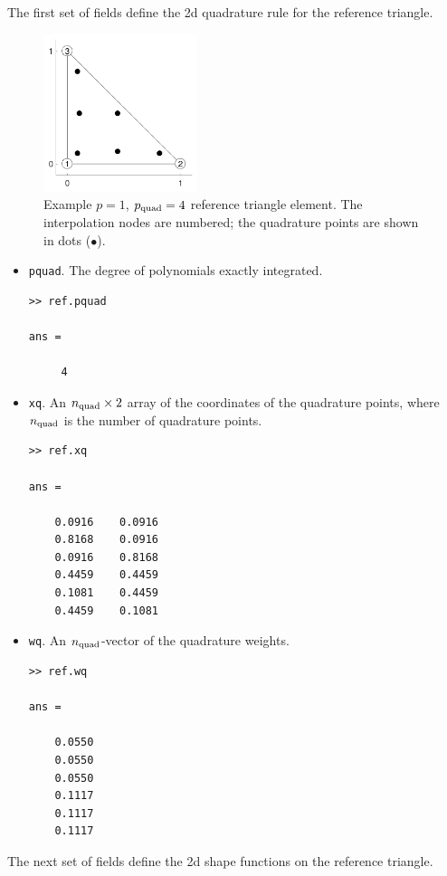 \documentclass[openany,preprint,11pt]{article}
\begin{document}
The first set of fields define the 2d quadrature rule for the reference triangle.
\begin{figure}[!h]
  \centering
  \includegraphics[width=0.4\textwidth]{ref_p1}
  \caption{Example $p=1$, $p_{\rm quad} = 4$ reference triangle element.  The interpolation nodes are numbered; the quadrature points are shown in dots ($\bullet$).}
\end{figure}
\begin{itemize}
\item \texttt{pquad}.  The degree of polynomials exactly integrated.
\begin{verbatim}
>> ref.pquad

ans =

     4
\end{verbatim}
\item \texttt{xq}. An $n_{\rm quad} \times 2$ array of the coordinates of the quadrature points, where $n_{\rm quad}$ is the number of quadrature points.
\begin{verbatim}
>> ref.xq

ans =

    0.0916    0.0916
    0.8168    0.0916
    0.0916    0.8168
    0.4459    0.4459
    0.1081    0.4459
    0.4459    0.1081
\end{verbatim}
\item \texttt{wq}. An $n_{\rm quad}$-vector of the quadrature weights.
\begin{verbatim}
>> ref.wq

ans =

    0.0550
    0.0550
    0.0550
    0.1117
    0.1117
    0.1117
\end{verbatim}
\end{itemize}
The next set of fields define the 2d shape functions on the reference triangle.
\end{document}
